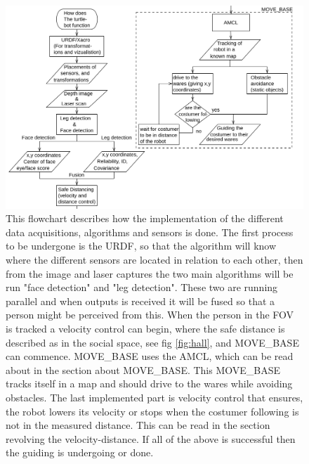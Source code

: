 \begin{figure}[H]
    \centering
    \includegraphics[width=1\textwidth]{figures/imp1.png}
    \caption{This flowchart describes how the implementation of the different data acquisitions, algorithms and sensors is done. The first process to be undergone is the URDF, so that the algorithm will know where the different sensors are located in relation to each other, then from the image and laser captures the two main algorithms will be run "face detection" and "leg detection". These two are running parallel and when outputs is received it will be fused so that a person might be perceived from this. When the person in the FOV is tracked a velocity control can begin, where the safe distance is described as in the social space, see fig \ref{fig:hall}, and MOVE\_BASE can commence. MOVE\_BASE uses the AMCL, which can be read about in the section about MOVE\_BASE. This MOVE\_BASE tracks itself in a map and should drive to the wares while avoiding obstacles. The last  implemented part is velocity control that ensures, the robot lowers its velocity or stops when the costumer following is not in the measured distance. This can be read in the section revolving the velocity-distance. If all of the above is successful then the guiding is undergoing or done.}
    \label{fig:dia}
\end{figure}

